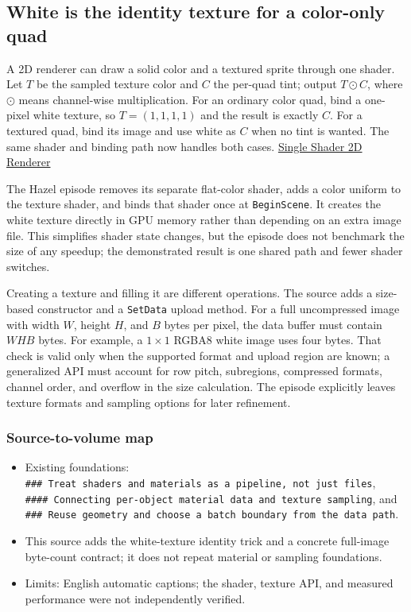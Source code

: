 \subsection{White is the identity texture for a color-only quad}\label{06-engine-ii-ch031-white-is-the-identity-texture-for-a-color-only-quad}

A 2D renderer can draw a solid color and a textured sprite through one shader. Let \(T\) be the sampled texture color and \(C\) the per-quad tint; output \(T\odot C\), where \(\odot\) means channel-wise multiplication. For an ordinary color quad, bind a one-pixel white texture, so \(T=(1,1,1,1)\) and the result is exactly \(C\). For a textured quad, bind its image and use white as \(C\) when no tint is wanted. The same shader and binding path now handles both cases. \href{https://www.youtube.com/watch?v=-myXuS3t1W4}{Single Shader 2D Renderer}

The Hazel episode removes its separate flat-color shader, adds a color uniform to the texture shader, and binds that shader once at \texttt{BeginScene}. It creates the white texture directly in GPU memory rather than depending on an extra image file. This simplifies shader state changes, but the episode does not benchmark the size of any speedup; the demonstrated result is one shared path and fewer shader switches.

Creating a texture and filling it are different operations. The source adds a size-based constructor and a \texttt{SetData} upload method. For a full uncompressed image with width \(W\), height \(H\), and \(B\) bytes per pixel, the data buffer must contain \(W H B\) bytes. For example, a \(1\times1\) RGBA8 white image uses four bytes. That check is valid only when the supported format and upload region are known; a generalized API must account for row pitch, subregions, compressed formats, channel order, and overflow in the size calculation. The episode explicitly leaves texture formats and sampling options for later refinement.

\subsubsection{Source-to-volume map}\label{06-engine-ii-ch031-source-to-volume-map}

\begin{itemize}
\tightlist
\item
  Existing foundations: \texttt{\#\#\#\ Treat\ shaders\ and\ materials\ as\ a\ pipeline,\ not\ just\ files}, \texttt{\#\#\#\#\ Connecting\ per-object\ material\ data\ and\ texture\ sampling}, and \texttt{\#\#\#\ Reuse\ geometry\ and\ choose\ a\ batch\ boundary\ from\ the\ data\ path}.
\item
  This source adds the white-texture identity trick and a concrete full-image byte-count contract; it does not repeat material or sampling foundations.
\item
  Limits: English automatic captions; the shader, texture API, and measured performance were not independently verified.
\end{itemize}

